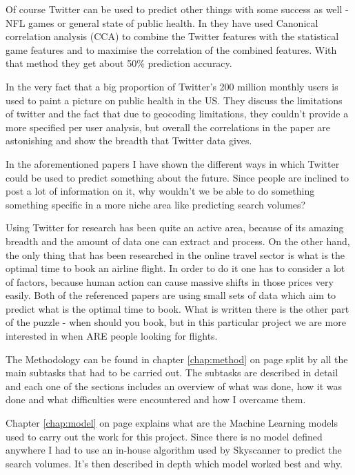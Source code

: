 \documentclass[minf,frontabs,twoside,singlespacing,parskip]{infthesis}
\begin{document}
Of course Twitter can be used to predict other things with some success as well - NFL games \cite{twitnfl} or general state of public health. \cite{twitflu} In \cite{twitnfl} they have used Canonical correlation analysis (CCA) to combine the Twitter features with the statistical game features and to maximise the correlation of the combined features. With that method they get about 50\% prediction accuracy. 


In \cite{twitflu} the very fact that a big proportion of Twitter's 200 million monthly users is used to paint a picture on public health in the US. They discuss the limitations of twitter and the fact that due to geocoding limitations, they couldn't provide a more specified per user analysis, but overall the correlations in the paper are astonishing and show the breadth that Twitter data gives. 


In the aforementioned papers I have shown the different ways in which Twitter could be used to predict something about the future. Since people are inclined to post a lot of information on it, why wouldn't we be able to do something something specific in a more niche area like predicting search volumes?


Using Twitter for research has been quite an active area, because of its amazing breadth and the amount of data one can extract and process.
On the other hand, the only thing that has been researched in the online travel sector is what is the optimal time to book an airline flight. \cite{Hamletkdd03} \cite{ijcai} In order to do it one has to consider a lot of factors, because human action can cause massive shifts in those prices very easily. 
Both of the referenced papers are using small sets of data which aim to predict what is the optimal time to book. What is written there is the other part of the puzzle - when should you book, but in this particular project we are more interested in when ARE people looking for flights.


The Methodology can be found in chapter \ref{chap:method} on page \pageref{chap:method} split by all the main subtasks that had to be carried out. The subtasks are described in detail and each one of the sections includes an overview of what was done, how it was done and what difficulties were encountered and how I overcame them. 


Chapter \ref{chap:model} on page \pageref{chap:model} explains what are the Machine Learning models used to carry out the work for this project. Since there is no model defined anywhere I had to use an in-house algorithm used by Skyscanner to predict the search volumes. It's then described in depth which model worked best and why. 
\end{document}

